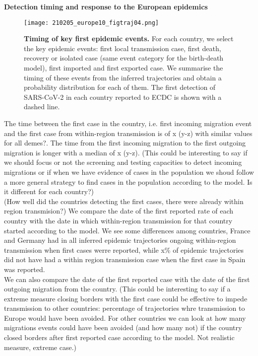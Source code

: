 \textbf{Detection timing and response to the European epidemics}


\begin{figure}[p]
    \centering
    \texttt{[image: 210205\_europe10\_figtraj04.png]}
    \caption{\textbf{Timing of key first epidemic events.} For each country, we select the key epidemic events: first local transmission case, first death, recovery or isolated case (same event category for the birth-death model), first imported and first exported case. We summarise the timing of these events from the inferred trajectories and obtain a probability distribution for each of them. The first detection of SARS-CoV-2 in each country reported to ECDC is shown with a dashed line.}
    \label{fig:first_events}
\end{figure}


The time between the first case in the country, i.e. first incoming migration event and the first case from within-region transmission is of x  (y-z) with similar values for all demes?. The time from the first incoming migration to the first outgoing migration is longer with a median of x (y-z). (This could be interesting to say if we should focus or not the screening and testing capacities to detect incoming migrations or if when we have evidence of cases in the population we shoud follow a more general strategy to find cases in the population according to the model. Is it different for each country?)\\

(How well did the countries detecting the first cases, there were already within region transmision?) We compare the date of the first reported rate of each country with the date in which within-region transmission for that country started according to the model. We see some differences among countries, France and Germany had in all inferred epidemic trajectories ongoing within-region transmission when first cases werre reported, while x\% of epidemic trajectories did not have had a within region transmission case when the first case in Spain was reported.\\


We can also compare the date of the first reported case with the date of the first outgoing migration from the country. (This could be interesting to say if a extreme measure closing borders with the first case could be effective to impede transmission to other countries: percentage of trajectories whre transmission to Europe would have been avoided. For other countries we can look at how many migrations events could have been avoided (and how many not) if the country closed borders after first reported case according to the model. Not realistic measure, extreme case.)\\ 


